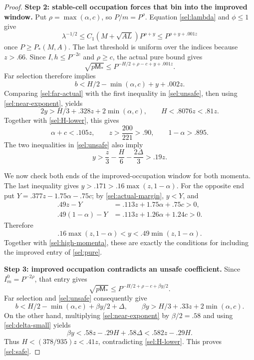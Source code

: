 \begin{proof}
\smallskip\noindent\textbf{Step 2: stable-cell occupation forces that bin into the improved window.}
Put $\rho=\max(\alpha,c)$, so $P/m=P^\rho$. Equation
\eqref{sel:lambda} and $\phi\le1$ give
\[
 \lambda^{-1/2}
 \le C_1(M+\sqrt{AL})P^{\rho+y}
 \le P^{\rho+y+.001z}
\]
once $P\ge P_*(M,A)$. The last threshold is uniform over the indices
because $z>.66$. Since $I,h\le P^{-2c}$ and $\rho\ge c$, the actual
pure bound gives
\[
 \sqrt{p\mathsf M_*}
 \le P^{-H/2+\rho-c+y+.001z}.
\]
Far selection therefore implies
\begin{equation}\label{sel:far-actual}
 b<H/2-\min(\alpha,c)+y+.002z.
\end{equation}
Comparing \eqref{sel:far-actual} with the first inequality in
\eqref{sel:unsafe}, then using \eqref{sel:near-exponent}, yields
\begin{equation}\label{sel:middle}
 2y>H/3+.328z+2\min(\alpha,c),\qquad
 H<.8076z<.81z.
\end{equation}
Together with \eqref{sel:H-lower}, this gives
\begin{equation}\label{sel:high-momenta}
 \alpha+c<.105z,\qquad z>\frac{200}{221}>.90,
 \qquad1-\alpha>.895.
\end{equation}
The two inequalities in \eqref{sel:unsafe} also imply
\[
 y>\frac z3-\frac H6-\frac{2\Delta}3>.19z.
\]

We now check both ends of the improved-occupation window for both
momenta. The last inequality gives
$y>.171>.16\max(z,1-\alpha)$. For the opposite end put
$Y=.377z-1.75\alpha-.75c$; by \eqref{sel:actual-margin}, $y<Y$, and
\begin{align*}
 .49z-Y&=.113z+1.75\alpha+.75c>0,\\
 .49(1-\alpha)-Y&=.113z+1.26\alpha+1.24c>0.
\end{align*}
Therefore
\[
 .16\max(z,1-\alpha)<y<.49\min(z,1-\alpha).
\]
Together with \eqref{sel:high-momenta}, these are exactly the conditions
for including the improved entry of \eqref{sel:pure}.

\smallskip\noindent\textbf{Step 3: improved occupation contradicts an unsafe coefficient.}
Since $I_m^0=P^{-2\rho}$, that entry gives
\[
 \sqrt{p\mathsf M_*}
 \le P^{-H/2+\rho-c+\beta y/2}.
\]
Far selection and \eqref{sel:unsafe} consequently give
\[
 b<H/2-\min(\alpha,c)+\beta y/2+\Delta,
 \qquad
 \beta y>H/3+.33z+2\min(\alpha,c).
\]
On the other hand, multiplying \eqref{sel:near-exponent} by
$\beta/2=.58$ and using \eqref{sel:delta-small} yields
\[
 \beta y<.58z-.29H+.58\Delta<.582z-.29H.
\]
Thus $H<(378/935)z<.41z$, contradicting \eqref{sel:H-lower}.
This proves \eqref{sel:safe}.
\end{proof}

